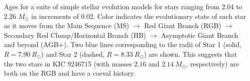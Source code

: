 \label{fig:mesa} Ages for a suite of simple stellar evolution models for stars ranging from 2.04 to 2.26 $M_{\odot}$ in increments of 0.02. Color indicates the evolutionary state of each star as it moves from the Main Sequence (MS) $\rightarrow$ Red Giant Branch (RGB) $\rightarrow$ Secondary Red Clump/Horizontal Branch (HB) $\rightarrow$ Asymptotic Giant Branch and beyond (AGB+). Two blue lines corresponding to the radii of Star 1 (solid, $R = 7.90 \ R_\odot$) and Star 2 (dashed, $R = 8.33 \ R_\odot$) are shown. This suggests that the two stars in KIC 9246715 (with masses $2.16$ and $2.14 \ M_\odot$, respectively) are both on the RGB and have a coeval history.

  
  
  
  
  
  